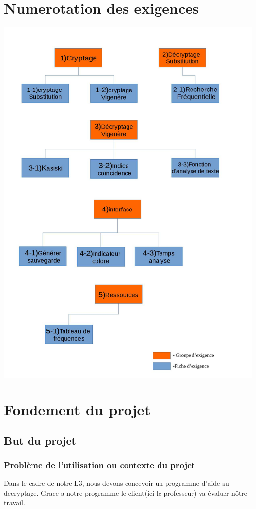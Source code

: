 \documentclass[a4]{article}
\begin{document}
	\section{Numerotation des exigences}
				\includegraphics[scale=0.5]{Arbre.jpg} 
		
	\section{Fondement du projet}
		\subsection{But du projet} 
			\subsubsection{Problème de l'utilisation ou contexte du projet}
				Dans le cadre de notre L3, nous devons concevoir un programme d'aide au decryptage.
				Grace a notre programme le client(ici le professeur) va évaluer nôtre travail.
\end{document}
